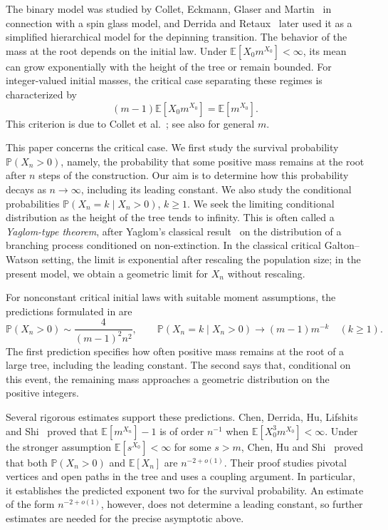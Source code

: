 \documentclass[11pt,letterpaper,reqno]{amsart}
\numberwithin{equation}{section}
\theoremstyle{plain}
\theoremstyle{remark}
\newcommand{\E}{\mathbb E}\newcommand{\Pp}{\mathbb P}
\begin{document}
The binary model was studied by Collet, Eckmann, Glaser and Martin~\cite{CEGM} in connection with a spin glass model, and Derrida and Retaux~\cite{DR} later used it as a simplified hierarchical model for the depinning transition. The behavior of the mass at the root depends on the initial law. Under $\E[X_0m^{X_0}]<\infty$, its mean can grow exponentially with the height of the tree or remain bounded. For integer-valued initial masses, the critical case separating these regimes is characterized by
\[
 (m-1)\E[X_0m^{X_0}]=\E[m^{X_0}].
\]
This criterion is due to Collet et al.~\cite{CEGM}; see also \cite[Theorem~1]{CDHLS} for general $m$.

This paper concerns the critical case. We first study the survival probability $\Pp(X_n>0)$, namely, the probability that some positive mass remains at the root after $n$ steps of the construction. Our aim is to determine how this probability decays as $n\to\infty$, including its leading constant. We also study the conditional probabilities $\Pp(X_n=k\mid X_n>0)$, $k\ge1$. We seek the limiting conditional distribution as the height of the tree tends to infinity. This is often called a \emph{Yaglom-type theorem}, after Yaglom's classical result~\cite{Yaglom} on the distribution of a branching process conditioned on non-extinction. In the classical critical Galton--Watson setting, the limit is exponential after rescaling the population size; in the present model, we obtain a geometric limit for $X_n$ without rescaling.

For nonconstant critical initial laws with suitable moment assumptions, the predictions formulated in \cite[Conjectures~1 and~2]{CDHLS} are
\[
 \Pp(X_n>0)\sim\frac4{(m-1)^2n^2},
 \qquad
 \Pp(X_n=k\mid X_n>0)\longrightarrow(m-1)m^{-k}
 \quad(k\ge1).
\]
The first prediction specifies how often positive mass remains at the root of a large tree, including the leading constant. The second says that, conditional on this event, the remaining mass approaches a geometric distribution on the positive integers.

Several rigorous estimates support these predictions. Chen, Derrida, Hu, Lifshits and Shi~\cite{CDHLS} proved that $\E[m^{X_n}]-1$ is of order $n^{-1}$ when $\E[X_0^3m^{X_0}]<\infty$. Under the stronger assumption $\E[s^{X_0}]<\infty$ for some $s>m$, Chen, Hu and Shi~\cite[Theorem~1.2]{CHS} proved that both $\Pp(X_n>0)$ and $\E[X_n]$ are $n^{-2+o(1)}$. Their proof studies pivotal vertices and open paths in the tree and uses a coupling argument. In particular, it establishes the predicted exponent two for the survival probability. An estimate of the form $n^{-2+o(1)}$, however, does not determine a leading constant, so further estimates are needed for the precise asymptotic above.
\end{document}
